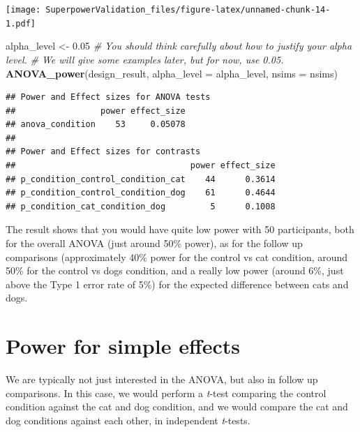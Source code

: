 \documentclass[]{book}
\newenvironment{Shaded}{\begin{snugshade}}{\end{snugshade}}
\newcommand{\CommentTok}[1]{\textcolor[rgb]{0.56,0.35,0.01}{\textit{#1}}}
\newcommand{\DataTypeTok}[1]{\textcolor[rgb]{0.13,0.29,0.53}{#1}}
\newcommand{\FloatTok}[1]{\textcolor[rgb]{0.00,0.00,0.81}{#1}}
\newcommand{\KeywordTok}[1]{\textcolor[rgb]{0.13,0.29,0.53}{\textbf{#1}}}
\newcommand{\NormalTok}[1]{#1}
\newcommand{\StringTok}[1]{\textcolor[rgb]{0.31,0.60,0.02}{#1}}
\begin{document}
\texttt{[image: SuperpowerValidation\_files/figure-latex/unnamed-chunk-14-1.pdf]}

\begin{Shaded}
\begin{Highlighting}[]
\NormalTok{alpha_level <-}\StringTok{ }\FloatTok{0.05}
\CommentTok{# You should think carefully about how to justify your alpha level.}
\CommentTok{# We will give some examples later, but for now, use 0.05.}
\KeywordTok{ANOVA_power}\NormalTok{(design_result, }\DataTypeTok{alpha_level =}\NormalTok{ alpha_level, }\DataTypeTok{nsims =}\NormalTok{ nsims)}
\end{Highlighting}
\end{Shaded}

\begin{verbatim}
## Power and Effect sizes for ANOVA tests
##                 power effect_size
## anova_condition    53     0.05078
## 
## Power and Effect sizes for contrasts
##                                   power effect_size
## p_condition_control_condition_cat    44      0.3614
## p_condition_control_condition_dog    61      0.4644
## p_condition_cat_condition_dog         5      0.1008
\end{verbatim}

\begin{Shaded}
\end{Shaded}

The result shows that you would have quite low power with 50 participants, both for the overall ANOVA (just around 50\% power), as for the follow up comparisons (approximately 40\% power for the control vs cat condition, around 50\% for the control vs dogs condition, and a really low power (around 6\%, just above the Type 1 error rate of 5\%) for the expected difference between cats and dogs.

\hypertarget{power-for-simple-effects}{%
\section{Power for simple effects}\label{power-for-simple-effects}}

We are typically not just interested in the ANOVA, but also in follow up comparisons. In this case, we would perform a \emph{t}-test comparing the control condition against the cat and dog condition, and we would compare the cat and dog conditions against each other, in independent \emph{t}-tests.
\end{document}
